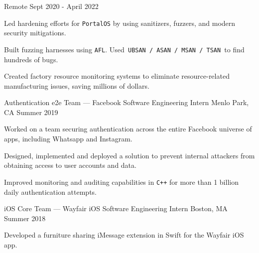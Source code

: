 \begin{cventries}
{Remote} %
{Sept 2020 - April 2022} %
{
	\begin{cvitems} %
		\item {Led hardening efforts for \texttt{PortalOS} by using sanitizers, fuzzers, and modern security mitigations.} 
		\item {Built fuzzing harnesses using \texttt{AFL}. Used\texttt{ UBSAN / ASAN / MSAN / TSAN }to find hundreds of bugs.}
		\item {Created factory resource monitoring systems to eliminate resource-related manufacturing issues, saving millions of dollars.}
	\end{cvitems}
}
\cventry
{Authentication e2e Team — Facebook} %
{Software Engineering Intern} %
{Menlo Park, CA} %
{Summer 2019} %
{
	\begin{cvitems} %
		\item {Worked on a team securing authentication across the entire Facebook universe of apps, including Whatsapp and Instagram.}
		\item {Designed, implemented and deployed a solution to prevent internal attackers from obtaining access to user accounts and data.}
		\item {Improved monitoring and auditing capabilities in \texttt{C++} for more than 1 billion daily authentication attempts.}
	\end{cvitems}
}
\cventry
{\textnormal{i}OS Core Team — Wayfair} %
{iOS Software Engineering Intern} %
{Boston, MA} %
{Summer 2018} %
{
	\begin{cvitems} %
		\item {Developed a furniture sharing iMessage extension in Swift for the Wayfair iOS app.}

\end{cvitems}}
\end{cventries}

